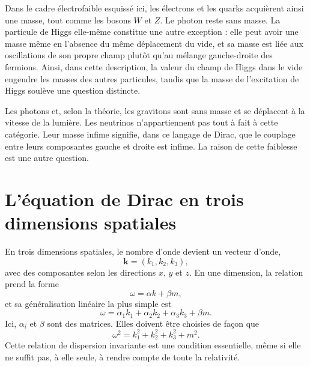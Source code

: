 Dans le cadre électrofaible esquissé ici, les électrons et les quarks acquièrent ainsi une masse, tout comme les bosons \(W\) et \(Z\). Le photon reste sans masse. La particule de Higgs elle-même constitue une autre exception : elle peut avoir une masse même en l’absence du même déplacement du vide, et sa masse est liée aux oscillations de son propre champ plutôt qu’au mélange gauche-droite des fermions. Ainsi, dans cette description, la valeur du champ de Higgs dans le vide engendre les masses des autres particules, tandis que la masse de l’excitation de Higgs soulève une question distincte.

\begin{classroomqa}
\end{classroomqa}

Les photons et, selon la théorie, les gravitons sont sans masse et se déplacent à la vitesse de la lumière. Les neutrinos n’appartiennent pas tout à fait à cette catégorie. Leur masse infime signifie, dans ce langage de Dirac, que le couplage entre leurs composantes gauche et droite est infime. La raison de cette faiblesse est une autre question.

\section{L’équation de Dirac en trois dimensions spatiales}

En trois dimensions spatiales, le nombre d’onde devient un vecteur d’onde,
\begin{equation}
\mathbf{k}=(k_1,k_2,k_3),
\end{equation}
avec des composantes selon les directions \(x\), \(y\) et \(z\). En une dimension, la relation prend la forme
\begin{equation}
\omega=\alpha k+\beta m,
\end{equation}
et sa généralisation linéaire la plus simple est
\begin{equation}
\omega
=
\alpha_1 k_1+\alpha_2 k_2+\alpha_3 k_3+\beta m.
\end{equation}
Ici, \(\alpha_i\) et \(\beta\) sont des matrices. Elles doivent être choisies de façon que
\begin{equation}
\omega^2=k_1^2+k_2^2+k_3^2+m^2.
\end{equation}
Cette relation de dispersion invariante est une condition essentielle, même si elle ne suffit pas, à elle seule, à rendre compte de toute la relativité.

